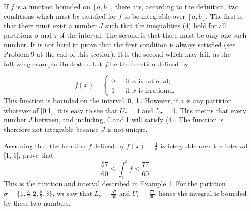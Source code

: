 If $f$ is a function bounded on $[a, b]$, there are, according to the definition, two conditions which must be satisfied for $f$ to be integrable over $[a, b]$. The first is that there must exist a number $J$ such that the inequalities (4) hold for all partitions $\sigma$ and $\tau$ of the interval. The second is that there must be only one such number. It is not hard to prove that the first condition is always satisfied (see Problem 9 at the end of this section). It is the second which may fail, as the following example illustrates. Let $f$ be the function defined by

$$
f(x) = \left \{ \begin{array} {ll}
                                  0  &\;\;\;\mbox{if $x$ is rational,}\\
                                  1  &\;\;\;\mbox{if $x$ is irrational.}
             \end{array}
          \right.
$$
\noindent This function is bounded on the interval [0, 1]. However, if a is any partition whatever of [0,1], it is easy to see that $U_{\sigma} = 1$ and $L_{\sigma} = 0$. This means that every number $J$ between, and including, 0 and 1 will satisfy (4). The function is therefore not integrable because $J$ is not unique.

\begin{example}
Assuming that the function $f$ defined by $f(x) = \frac{1}{x}$ is integrable over the interval [1, 3], prove that   
$$
\frac{57}{60} \leq \int_{1}^{3} f \leq \frac{77}{60}.
$$
\noindent This is the function and interval described in Example 1. For the partition $\sigma = \{ 1, \frac{3}{2}, 2, \frac{5}{2}, 3 \}$, we saw that $L_{\sigma} = \frac{57}{60}$ and $U_{\sigma} =\frac{77}{60}$; hence the integral is bounded by these two numbers.
\end{example}
\medskip


